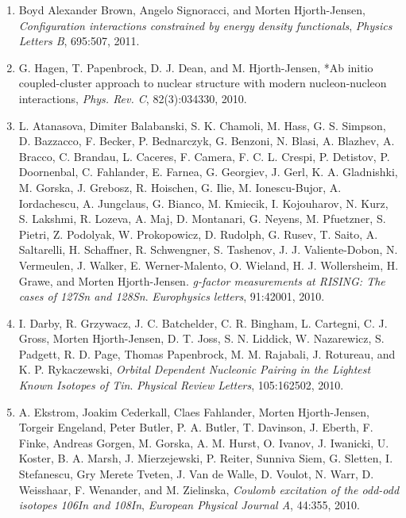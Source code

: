 \documentclass[%
oneside,                 %
final,                   %
10pt]{article}
\begin{document}
\begin{enumerate}
\item Boyd Alexander Brown, Angelo Signoracci, and Morten Hjorth-Jensen,  \emph{Configuration interactions constrained by energy density  functionals},  \emph{Physics Letters B}, 695:507, 2011.  

\item G. Hagen, T. Papenbrock, D. J. Dean, and M. Hjorth-Jensen,  *Ab initio coupled-cluster approach to nuclear structure with modern   nucleon-nucleon interactions,  \emph{Phys. Rev. C}, 82(3):034330, 2010.  

\item L. Atanasova, Dimiter Balabanski, S. K. Chamoli, M. Hass, G. S. Simpson,   D. Bazzacco, F. Becker, P. Bednarczyk, G. Benzoni, N. Blasi, A. Blazhev,   A. Bracco, C. Brandau, L. Caceres, F. Camera, F. C. L. Crespi, P. Detistov,   P. Doornenbal, C. Fahlander, E. Farnea, G. Georgiev, J. Gerl, K. A.   Gladnishki, M. Gorska, J. Grebosz, R. Hoischen, G. Ilie, M. Ionescu-Bujor,   A. Iordachescu, A. Jungclaus, G. Bianco, M. Kmiecik, I. Kojouharov, N. Kurz,   S. Lakshmi, R. Lozeva, A. Maj, D. Montanari, G. Neyens, M. Pfuetzner,   S. Pietri, Z. Podolyak, W. Prokopowicz, D. Rudolph, G. Rusev, T. Saito,   A. Saltarelli, H. Schaffner, R. Schwengner, S. Tashenov, J. J.   Valiente-Dobon, N. Vermeulen, J. Walker, E. Werner-Malento, O. Wieland, H. J.   Wollersheim, H. Grawe, and Morten Hjorth-Jensen.  \emph{g-factor measurements at RISING: The cases of 127Sn and   128Sn}.  \emph{Europhysics letters}, 91:42001, 2010. 

\item I. Darby, R. Grzywacz, J. C. Batchelder, C. R. Bingham, L. Cartegni, C. J.   Gross, Morten Hjorth-Jensen, D. T. Joss, S. N. Liddick, W. Nazarewicz,   S. Padgett, R. D. Page, Thomas Papenbrock, M. M. Rajabali, J. Rotureau, and   K. P. Rykaczewski, \emph{Orbital Dependent Nucleonic Pairing in the Lightest Known   Isotopes of Tin}.  \emph{Physical Review Letters}, 105:162502, 2010. 

\item A. Ekstrom, Joakim Cederkall, Claes Fahlander, Morten Hjorth-Jensen, Torgeir   Engeland, Peter Butler, P. A. Butler, T. Davinson, J. Eberth, F. Finke,   Andreas Gorgen, M. Gorska, A. M. Hurst, O. Ivanov, J. Iwanicki, U. Koster,   B. A. Marsh, J. Mierzejewski, P. Reiter, Sunniva Siem, G. Sletten,   I. Stefanescu, Gry Merete Tveten, J. Van de Walle, D. Voulot, N. Warr,   D. Weisshaar, F. Wenander, and M. Zielinska, \emph{Coulomb excitation of the odd-odd isotopes 106In and 108In},  \emph{European Physical Journal A}, 44:355, 2010. 


\end{enumerate}
\end{document}

